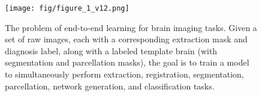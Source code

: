 
\begin{figure}[t]
  \centering
  \texttt{[image: fig/figure\_1\_v12.png]}
  \vspace{-10pt}
  \caption{
The problem of end-to-end learning for brain imaging tasks. Given a set of raw images, each with a corresponding extraction mask and diagnosis label, along with a labeled template brain (with segmentation and parcellation masks), the goal is to train a model to simultaneously perform extraction, registration, segmentation, parcellation, network generation, and classification tasks.
  }
  \label{fig:intro}
  \vspace{-10pt}
\end{figure}
